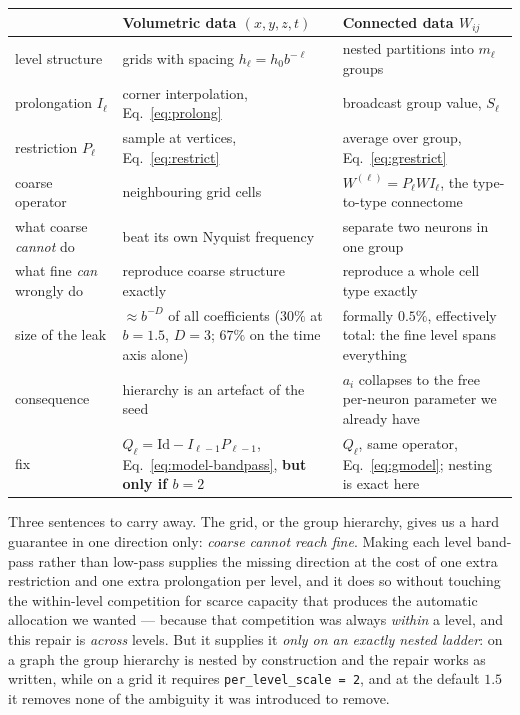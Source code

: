 \documentclass[11pt,a4paper]{article}
\newcommand{\Id}{\mathrm{Id}}
\begin{document}
\begin{center}
\begin{tabular}{@{}p{4.6cm}p{5.1cm}p{5.1cm}@{}}
\toprule
& \textbf{Volumetric data $(x,y,z,t)$} & \textbf{Connected data $W_{ij}$} \\
\midrule
level structure & grids with spacing $h_\ell = h_0 b^{-\ell}$
                & nested partitions into $m_\ell$ groups \\
prolongation $I_\ell$ & corner interpolation, Eq.~\eqref{eq:prolong}
                & broadcast group value, $S_\ell$ \\
restriction $P_\ell$ & sample at vertices, Eq.~\eqref{eq:restrict}
                & average over group, Eq.~\eqref{eq:grestrict} \\
coarse operator & neighbouring grid cells
                & $W^{(\ell)} = P_\ell W I_\ell$, the type-to-type connectome \\
what coarse \emph{cannot} do & beat its own Nyquist frequency
                & separate two neurons in one group \\
what fine \emph{can} wrongly do & reproduce coarse structure exactly
                & reproduce a whole cell type exactly \\
size of the leak & $\approx b^{-D}$ of all coefficients ($30\%$ at $b=1.5$, $D=3$;
                  $67\%$ on the time axis alone)
                & formally $0.5\%$, effectively total: the fine level spans everything \\
consequence & hierarchy is an artefact of the seed
                & $a_i$ collapses to the free per-neuron parameter we already have \\
fix & $Q_\ell = \Id - I_{\ell-1}P_{\ell-1}$, Eq.~\eqref{eq:model-bandpass},
                  \textbf{but only if $b=2$} & $Q_\ell$, same operator,
                  Eq.~\eqref{eq:gmodel}; nesting is exact here \\
\bottomrule
\end{tabular}
\end{center}

\bigskip
\noindent
Three sentences to carry away. The grid, or the group hierarchy, gives us a hard guarantee
in one direction only: \emph{coarse cannot reach fine}. Making each level band-pass rather
than low-pass supplies the missing direction at the cost of one extra restriction and one
extra prolongation per level, and it does so without touching the within-level competition
for scarce capacity that produces the automatic allocation we wanted --- because that
competition was always \emph{within} a level, and this repair is \emph{across} levels. But
it supplies it \emph{only on an exactly nested ladder}: on a graph the group hierarchy is
nested by construction and the repair works as written, while on a grid it requires
\texttt{per\_level\_scale = 2}, and at the default $1.5$ it removes none of the ambiguity it
was introduced to remove.
\end{document}
